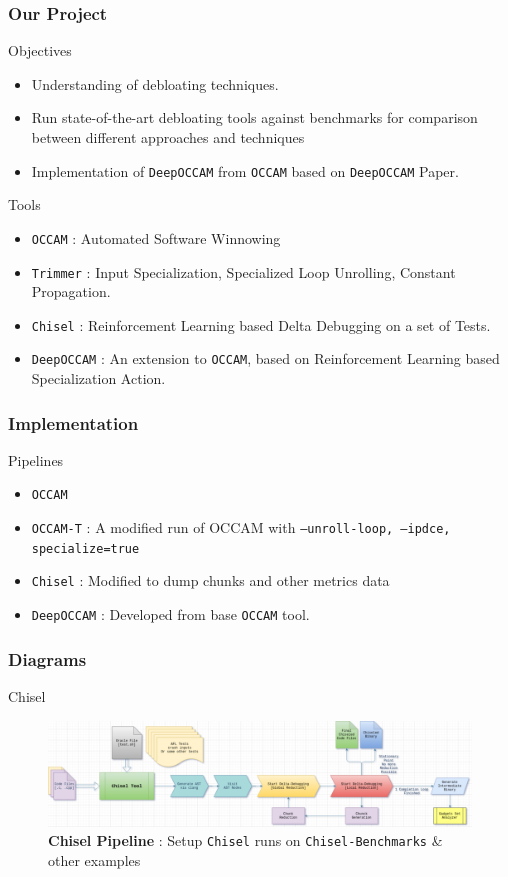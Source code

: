 \documentclass[9pt]{beamer}
\begin{document}
\begin{frame}
	\frametitle{Our Project}
	\pause
	\begin{block}{Objectives}
	\begin{itemize}
		\pause
		\item Understanding of debloating techniques.
		\pause
		\item Run state-of-the-art debloating tools against benchmarks for comparison between different approaches and techniques
		\pause
		\item Implementation of \texttt{DeepOCCAM} from \texttt{OCCAM} based on \texttt{DeepOCCAM} Paper. 
	\end{itemize}
\end{block}
	\begin{block}{Tools}
		\begin{itemize}
			\pause
			\item \texttt{OCCAM} : Automated Software Winnowing
			\pause
			\item \texttt{Trimmer} : Input Specialization, Specialized Loop Unrolling, Constant Propagation. 
			\pause
			\item \texttt{Chisel} : Reinforcement Learning based Delta Debugging on a set of Tests.
			\pause
			\item \texttt{DeepOCCAM} : An extension to \texttt{OCCAM}, based on Reinforcement Learning based Specialization Action. 
		\end{itemize}
	\end{block}
\end{frame}
\begin{frame}
	\frametitle{Implementation}
	\pause
	\begin{block}{Pipelines}
		\begin{itemize}
			\pause
			\item \texttt{OCCAM}
			\pause
			\item \texttt{OCCAM-T} : A modified run of OCCAM with \texttt{--unroll-loop, --ipdce, specialize=true}
			\pause
			\item \texttt{Chisel} : Modified to dump chunks and other metrics data
			\pause
			\item \texttt{DeepOCCAM} : Developed from base \texttt{OCCAM} tool. 
		\end{itemize}
	\end{block}
\end{frame}
\begin{frame}[fragile]
	\frametitle{Diagrams}
	\begin{block}{Chisel}
			\begin{figure}[H]
				\centering
				\includegraphics[width=1\linewidth]{imgs/chisel-pipeline.png}
				\caption{\textbf{Chisel Pipeline} : Setup \texttt{Chisel} runs on \texttt{Chisel-Benchmarks} \& other examples}%
				\label{fig:plant}
			\end{figure}
	\end{block}
\end{frame}
\end{document}
